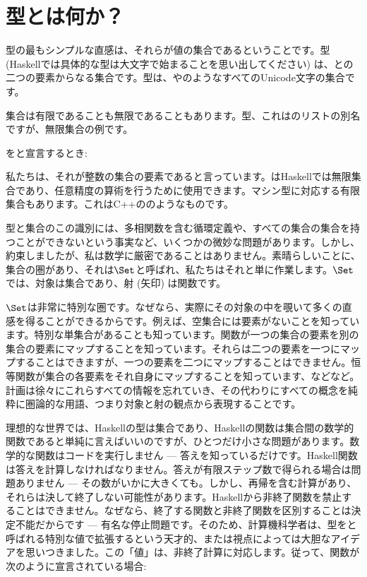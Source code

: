 \section{型とは何か？}

型の最もシンプルな直感は、それらが値の集合であるということです。型 (Haskellでは具体的な型は大文字で始まることを思い出してください) は、との二つの要素からなる集合です。型は、やのようなすべてのUnicode文字の集合です。

集合は有限であることも無限であることもあります。型、これはのリストの別名ですが、無限集合の例です。

をと宣言するとき: 

私たちは、それが整数の集合の要素であると言っています。はHaskellでは無限集合であり、任意精度の算術を行うために使用できます。マシン型に対応する有限集合もあります。これはC++ののようなものです。

型と集合のこの識別には、多相関数を含む循環定義や、すべての集合の集合を持つことができないという事実など、いくつかの微妙な問題があります。しかし、約束しましたが、私は数学に厳密であることはありません。素晴らしいことに、集合の圏があり、それは$\Set$と呼ばれ、私たちはそれと単に作業します。$\Set$では、対象は集合であり、射 (矢印) は関数です。

$\Set$は非常に特別な圏です。なぜなら、実際にその対象の中を覗いて多くの直感を得ることができるからです。例えば、空集合には要素がないことを知っています。特別な単集合があることも知っています。関数が一つの集合の要素を別の集合の要素にマップすることを知っています。それらは二つの要素を一つにマップすることはできますが、一つの要素を二つにマップすることはできません。恒等関数が集合の各要素をそれ自身にマップすることを知っています、などなど。計画は徐々にこれらすべての情報を忘れていき、その代わりにすべての概念を純粋に圏論的な用語、つまり対象と射の観点から表現することです。

理想的な世界では、Haskellの型は集合であり、Haskellの関数は集合間の数学的関数であると単純に言えばいいのですが、ひとつだけ小さな問題があります。数学的な関数はコードを実行しません --- 答えを知っているだけです。Haskell関数は答えを計算しなければなりません。答えが有限ステップ数で得られる場合は問題ありません --- その数がいかに大きくても。しかし、再帰を含む計算があり、それらは決して終了しない可能性があります。Haskellから非終了関数を禁止することはできません。なぜなら、終了する関数と非終了関数を区別することは決定不能だからです --- 有名な停止問題です。そのため、計算機科学者は、型をと呼ばれる特別な値で拡張するという天才的、または視点によっては大胆なアイデアを思いつきました。この「値」は、非終了計算に対応します。従って、関数が次のように宣言されている場合: 

